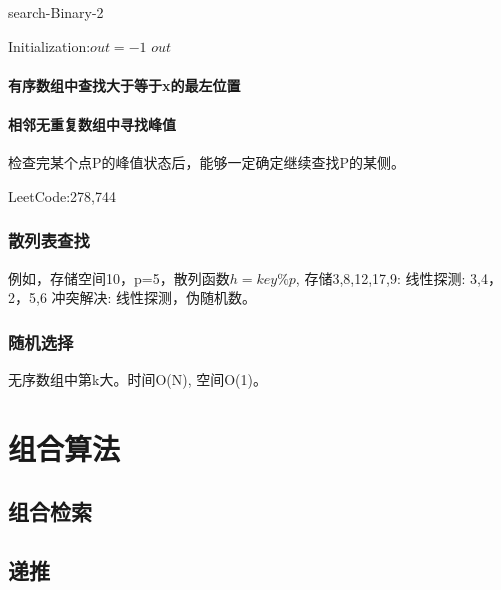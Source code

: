 \documentclass[UTF8]{../computerUniverse}
\begin{document}
      \begin{algorithm}[h]%
        \caption{search-Binary-2}\label{algo:search_Binary_2}
        \SetAlgoLined
        Initialization:$out = -1$\;
        \KwRet $out$\;
      \end{algorithm}


\subsubsection{有序数组中查找大于等于x的最左位置}

\subsubsection{相邻无重复数组中寻找峰值}
检查完某个点P的峰值状态后，能够一定确定继续查找P的某侧。


LeetCode:278,744

\subsection{散列表查找}
例如，存储空间10，p=5，散列函数$h=key\%p$,
存储3,8,12,17,9: 线性探测:  3,4，2，5,6
冲突解决: 线性探测，伪随机数。


\subsection{随机选择}
无序数组中第k大。时间O(N), 空间O(1)。



\chapter{组合算法}

\section{组合检索}

\section{递推}
\end{document}
